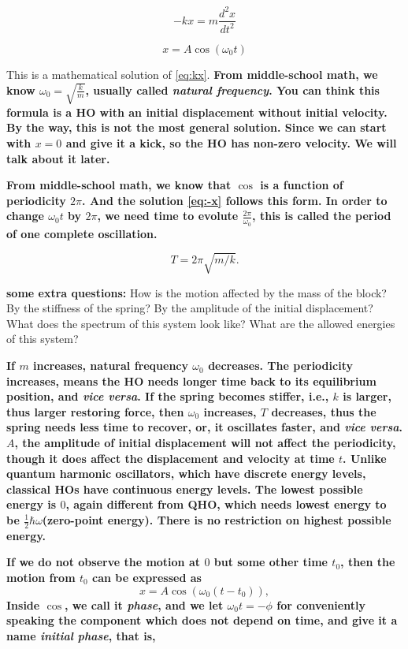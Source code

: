 \documentclass[]{revtex4}
\newcommand{\st}[1]{{\color{red}\bfseries #1}}
\begin{document}
\[-kx = m \frac{d^2x}{dt^2}\label{eq:kx}\]

\[x = A \cos (\omega_0 t) \label{eq:-x}\]

This is a mathematical solution of \eqref{eq:kx}.  
\st{
From middle-school math, we know $\omega_0 = \sqrt{\frac{ k }{ m }}$,
usually called \emph{natural frequency}.
You can think this
formula is a HO with an initial displacement without initial velocity. 
By the way, this is not the most general solution. 
Since we can start with $x = 0$ and give it a kick, so the HO has non-zero velocity.
We will talk about it later.
}

\st{
From middle-school math, we know that $\cos$ is a function of periodicity $2\pi$.
And the solution \eqref{eq:-x} follows this form. In order to change $\omega_0 t$ by $2\pi$, we need time to evolute $\frac{ 2\pi }{ \omega_0 }$, this is called the period of one complete oscillation.
}

\[T = 2\pi\sqrt{m/k}.\]

{\bfseries some extra questions:} How is the motion affected by the mass of the block? By the stiffness of the spring? By the amplitude of the initial displacement? What does the spectrum of this system look like?  What are the allowed energies of this system?

\st{
If $m$ increases, natural frequency $\omega_0$ decreases. The periodicity increases,
means the HO needs longer time back to its equilibrium position, and \textit{vice versa}.
If the spring becomes stiffer, i.e., $k$ is larger, 
thus larger restoring force, then
$\omega_0$ increases,
$T$ decreases, thus the spring needs less time to recover, or, it oscillates faster, and
\textit{vice versa}.
$A$, the amplitude of initial displacement will not affect the periodicity,
though it does affect the displacement and velocity at time $t$.
Unlike quantum harmonic oscillators, which have discrete energy levels, classical HOs
have continuous energy levels. The lowest possible energy is $0$, again different from
QHO, which needs lowest energy to be $\frac{ 1 }{ 2 } \hbar \omega$(zero-point energy). There is no restriction on highest possible energy.
}

\st{
If we do not observe the motion at $0$ but some other time $t_0$, then the motion
from $t_0$ can be expressed as 
}
\[x = A\cos(\omega_0 (t-t_0)),\]
\st{
Inside $\cos$, we call it \emph{phase},
and we let $\omega_0 t = - \phi$ for conveniently speaking the component which
does not depend on time, and give it a name \emph{initial phase}, that is,
}
\end{document}
